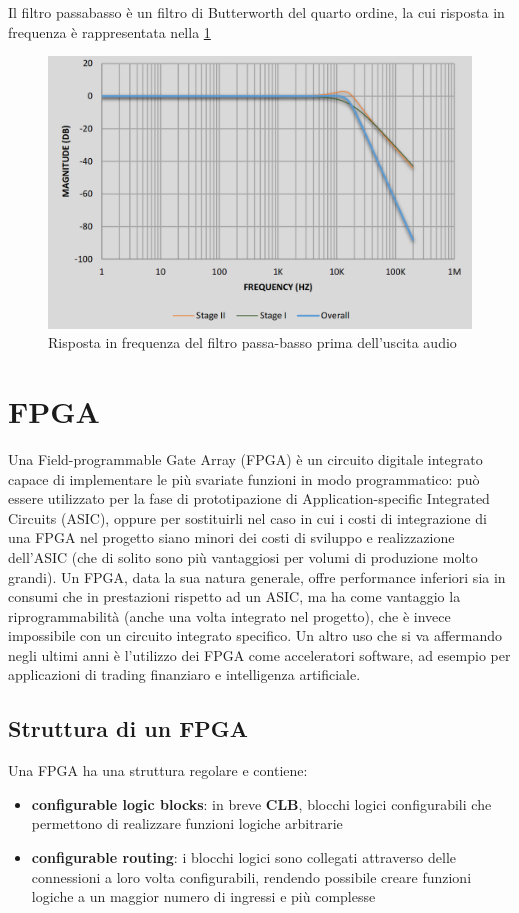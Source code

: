 Il filtro passabasso è un filtro di Butterworth del quarto ordine, la cui risposta
in frequenza è rappresentata nella \cref{fig:freq_resp}
\begin{figure}[h!]
	\centering
	\def\svgwidth{\columnwidth}
	\includegraphics[width=0.6\columnwidth]{TeX_files/freq_response.png}
    \caption{Risposta in frequenza del filtro passa-basso prima dell'uscita audio}
    \label{fig:freq_resp}
\end{figure}

\section{FPGA}
Una Field-programmable Gate Array (FPGA) è un circuito digitale integrato
capace di implementare le più svariate funzioni in modo programmatico:
può essere utilizzato per la fase di prototipazione di Application-specific
Integrated Circuits (ASIC), oppure per sostituirli nel caso in cui i costi
di integrazione di una FPGA nel progetto siano minori dei costi di sviluppo
e realizzazione dell'ASIC (che di solito sono più vantaggiosi per volumi
di produzione molto grandi).
Un FPGA, data la sua natura generale, offre performance inferiori sia
in consumi che in prestazioni rispetto ad un ASIC, ma ha come vantaggio
la riprogrammabilità (anche una volta integrato nel progetto), che
è invece impossibile con un circuito integrato specifico. 
Un altro uso che si va affermando negli ultimi anni è l'utilizzo dei
FPGA come acceleratori software, ad esempio per applicazioni di 
trading finanziaro e intelligenza artificiale.

\subsection{Struttura di un FPGA}
Una FPGA ha una struttura regolare e contiene:
\begin{itemize}
    \item \textbf{configurable logic blocks}: in breve \textbf{CLB}, blocchi
            logici configurabili che permettono di realizzare funzioni
            logiche arbitrarie
    \item \textbf{configurable routing}: i blocchi logici sono collegati
          attraverso delle connessioni a loro volta configurabili,
          rendendo possibile creare funzioni logiche a un maggior numero
          di ingressi e più complesse
\end{itemize}

